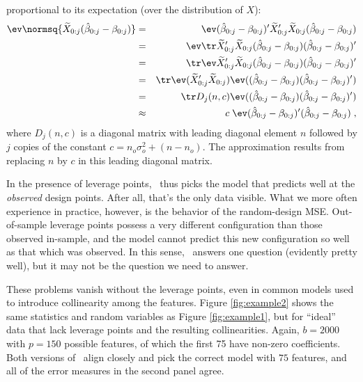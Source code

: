 \documentclass[12pt]{article}
\begin{document}
 proportional to its expectation (over the distribution of $X$):
 \begin{eqnarray}
  \ev \normsq{\widetilde{X}_{0:j}(\hat\beta_{0:j} - \beta_{0:j})}
   &=& \ev (\hat\beta_{0:j} - \beta_{0:j})' \widetilde{X}_{0:j}' 
            \widetilde{X}_{0:j} (\hat\beta_{0:j} - \beta_{0:j}) \cr
   &=& \ev \tr \widetilde{X}_{0:j}'\widetilde{X}_{0:j} 
           (\hat\beta_{0:j} - \beta_{0:j}) (\hat\beta_{0:j} - \beta_{0:j})' \cr
   &=& \tr \ev \widetilde{X}_{0:j}'\widetilde{X}_{0:j} 
           (\hat\beta_{0:j} - \beta_{0:j}) (\hat\beta_{0:j} - \beta_{0:j})' \cr
   &=& \tr \ev (\widetilde{X}_{0:j}'\widetilde{X}_{0:j})
           \ev ((\hat\beta_{0:j} - \beta_{0:j})(\hat\beta_{0:j} - \beta_{0:j})') \cr
   &=& \tr D_j(n,c) 
           \ev ((\hat\beta_{0:j} - \beta_{0:j})(\hat\beta_{0:j} - \beta_{0:j})') \cr
   &\approx& c \; 
           \ev (\hat\beta_{0:j} - \beta_{0:j})'(\hat\beta_{0:j} - \beta_{0:j})\;,
 \end{eqnarray}
 where $D_j(n,c)$ is a diagonal matrix with leading diagonal element $n$
 followed by $j$ copies of the constant $c = n_o \sigma_o^2 + (n - n_o)$.  The
 approximation results from replacing $n$ by $c$ in this leading diagonal
 matrix.

 
 In the presence of leverage points, \aic\ thus picks the model that predicts
 well at the {\em observed} design points.  After all, that's the only data
 visible.  What we more often experience in practice, however, is the behavior
 of the random-design MSE.  Out-of-sample leverage points possess a very
 different configuration than those observed in-sample, and the model cannot
 predict this new configuration so well as that which was observed.  In this
 sense, \aic\ answers one question (evidently pretty well), but it may not be
 the question we need to answer.


 These problems vanish without the leverage points, even in common models used
 to introduce collinearity among the features.  Figure \ref{fig:example2} shows
 the same statistics and random variables as Figure \ref{fig:example1}, but for
 ``ideal'' data that lack leverage points and the resulting
 collinearities.  Again, $b=2000$ with $p=150$ possible features, of which the
 first 75 have non-zero coefficients.  Both versions of \aic\ align closely and
 pick the correct model with $75$ features, and all of the error measures in the
 second panel agree.
\end{document}
